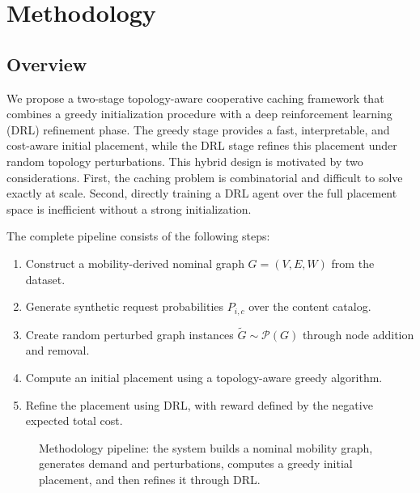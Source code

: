 \section{Methodology}

\subsection{Overview}

We propose a two-stage topology-aware cooperative caching framework that combines a greedy initialization procedure with a deep reinforcement learning (DRL) refinement phase. The greedy stage provides a fast, interpretable, and cost-aware initial placement, while the DRL stage refines this placement under random topology perturbations. This hybrid design is motivated by two considerations. First, the caching problem is combinatorial and difficult to solve exactly at scale. Second, directly training a DRL agent over the full placement space is inefficient without a strong initialization.

The complete pipeline consists of the following steps:
\begin{enumerate}
    \item Construct a mobility-derived nominal graph \(G=(V,E,W)\) from the dataset.
    \item Generate synthetic request probabilities \(P_{i,c}\) over the content catalog.
    \item Create random perturbed graph instances \(\tilde{G} \sim \mathcal{P}(G)\) through node addition and removal.
    \item Compute an initial placement using a topology-aware greedy algorithm.
    \item Refine the placement using DRL, with reward defined by the negative expected total cost.
\end{enumerate}

\begin{figure}[t]
\centering
{}
\caption{Methodology pipeline: the system builds a nominal mobility graph, generates demand and perturbations, computes a greedy initial placement, and then refines it through DRL.}
\label{fig:method_pipeline}
\end{figure}

